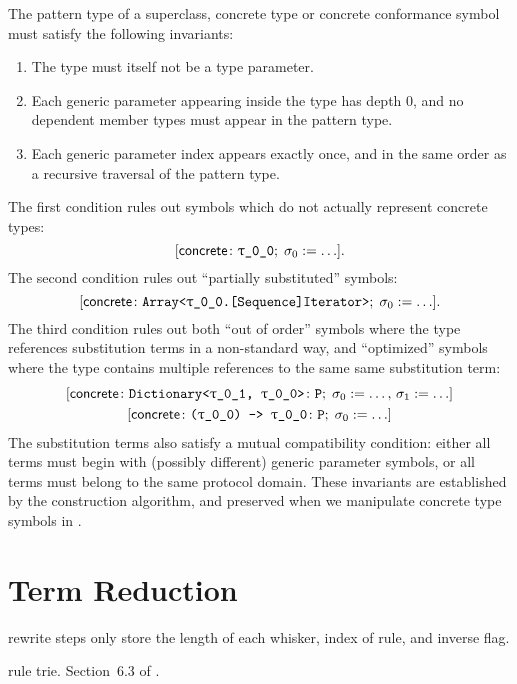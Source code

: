 \documentclass[../generics]{subfiles}
\begin{document}
The pattern type of a superclass, concrete type or concrete conformance symbol must satisfy the following invariants:
\begin{enumerate}
\item The type must itself not be a type parameter.
\item Each generic parameter appearing inside the type has depth 0, and no dependent member types must appear in the pattern type.
\item Each generic parameter index appears exactly once, and in the same order as a recursive traversal of the pattern type.
\end{enumerate}
The first condition rules out symbols which do not actually represent concrete types:
\[\concretesym{\ttgp{0}{0};\; \sigma_0 := \ldots}.\]
The second condition rules out ``partially substituted'' symbols:
\[\concretesym{\texttt{Array<\ttgp{0}{0}.[Sequence]Iterator>};\; \sigma_0 := \ldots}.\]
The third condition rules out both ``out of order'' symbols where the type references substitution terms in a non-standard way, and ``optimized'' symbols where the type contains multiple references to the same same substitution term:
\begin{gather*}
\concretesym{\texttt{Dictionary<\ttgp{0}{1}, \ttgp{0}{0}>}\colon\texttt{P};\;\sigma_0 := \ldots,\, \sigma_1 := \ldots}\\
\concretesym{\texttt{(\ttgp{0}{0}) -> \ttgp{0}{0}}\colon\texttt{P};\;\sigma_0 := \ldots}
\end{gather*}
The substitution terms also satisfy a mutual compatibility condition: either all terms must begin with (possibly different) generic parameter symbols, or all terms must belong to the same protocol domain. These invariants are established by the construction algorithm, and preserved when we manipulate concrete type symbols in .

\section{Term Reduction}\label{term reduction}


rewrite steps only store the length of each whisker, index of rule, and inverse flag.

rule trie. Section~6.3 of \cite{art3}.

\begin{algorithm}\label{trie insert algo}
\end{algorithm}
\end{document}
